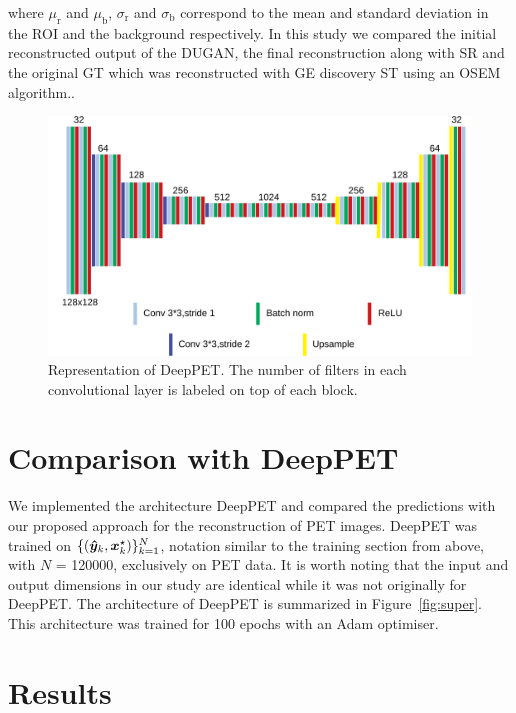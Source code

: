 where $\mu_\mathrm{r}$ and $\mu_\mathrm{b}$, $\sigma_\mathrm{r}$ and $\sigma_\mathrm{b}$ correspond to the mean and standard deviation in the \ac{ROI} and the background respectively. In this study we compared the initial reconstructed output of the \ac{DUGAN}, the final reconstruction along with \ac{SR} and the original \ac{GT} which was reconstructed with GE discovery ST using an \ac{OSEM} algorithm..     


\begin{figure}[!htbp]
	\centering
	\includegraphics[width=1.0\linewidth]{./Figures/deepPET-crop.pdf}
	\caption{Representation of DeepPET. The number of filters in each convolutional layer is labeled on top of each block.}
	\label{fig:deepPET}
\end{figure}

\section{Comparison with DeepPET}

We implemented the architecture DeepPET \cite{haeggstroem2018deeprec} and compared the predictions with our proposed approach for the reconstruction of PET images. DeepPET was trained on $\{(\bm{\hat{y}}_k, \bm{x}^\star_k)\}_{k=1}^N$, notation similar to the training section from above, with $N$ = 120000, exclusively on \ac{PET} data. It is worth noting that the input and output dimensions in our study are identical while it was not originally for DeepPET. The architecture of DeepPET is summarized in Figure~\ref{fig:super}. This architecture was trained for 100 epochs with an Adam optimiser. 


\section{Results}

